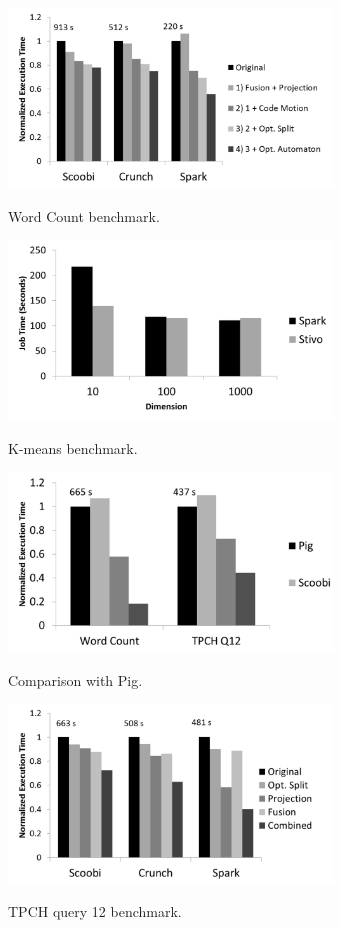 \begin{figure}[!hbt]
    \includegraphics[width=8.6cm]{figures/word-count}
    \label{fig:word-count}\\%
   \caption{Word Count benchmark.}
\end{figure}

\begin{figure}[!hbt]
    \includegraphics[width=8.6cm]{figures/k-means}
    \label{fig:k-means}\\%
   \caption{K-means benchmark.}
\end{figure}

\begin{figure}[!hbt]
    \includegraphics[width=8.6cm]{figures/pig}
    \label{fig:pig}\\%
   \caption{Comparison with Pig.}
\end{figure}

\begin{figure}[!hbt]
    \includegraphics[width=8.6cm]{figures/tpch}
    \label{fig:tpch}\\%
   \caption{TPCH query 12 benchmark.}
\end{figure}

